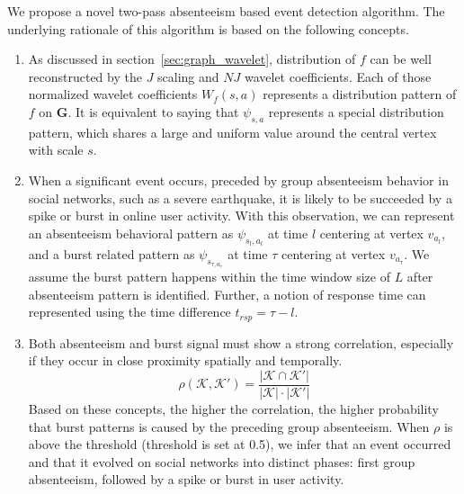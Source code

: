 We propose a novel two-pass absenteeism based event detection algorithm. The underlying rationale of this algorithm is based on the following concepts.
\begin{enumerate}
\item As discussed in section~\ref{sec:graph_wavelet}, distribution of $f$ can be well reconstructed by the $J$ scaling and $NJ$ wavelet coefficients. Each of those normalized wavelet coefficients $W_f(s,a)$ represents a distribution pattern of $f$ on $\mathbf{G}$.
It is equivalent to saying that $\psi_{s,a}$ represents a special distribution pattern, which shares a large and uniform value around the central vertex with scale $s$.
\item When a significant event occurs, preceded by group absenteeism behavior in social networks, such as a severe earthquake, it is likely to be succeeded by a spike or burst in online user activity.
With this observation, we can represent an absenteeism behavioral pattern as $\psi_{s_l,a_l}$ at time $l$ centering at vertex $v_{a_l}$, and a burst related pattern as $\psi_{s_{\tau,a_\tau}}$ at time $\tau$ centering at vertex $v_{a_\tau}$. We assume the burst pattern happens within the time window size of $L$ after absenteeism pattern is identified. Further, a notion of response time can represented using the time difference $t_{rsp}=\tau-l$.
\item Both absenteeism and burst signal must show a strong correlation, especially if they occur in close proximity spatially and temporally.
\begin{equation}
\label{eq:eventsimilarity}
\rho(\mathcal{K},\mathcal{K'}) = \frac{|\mathcal{K}\cap\mathcal{K'}|}{|\mathcal{K}|\cdot|\mathcal{K'}|}
\end{equation}
Based on these concepts, the higher the correlation, the higher probability that burst patterns is caused by the preceding group absenteeism. When $\rho$ is above the threshold (threshold is set at 0.5), we infer that an event occurred and that it evolved on social networks into distinct phases: first group absenteeism, followed by a spike or burst in user activity.
\end{enumerate}




